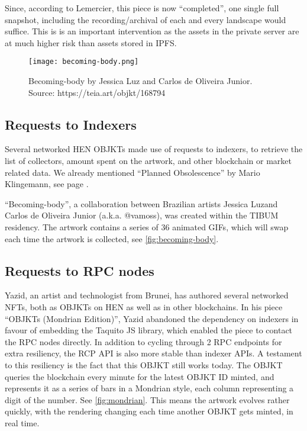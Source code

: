 Since, according to Lemercier, this piece is now ``completed'', one single full snapshot, including the recording/archival of each and every landscape would suffice. This is is an important intervention as the assets in the private server are at much higher risk than assets stored in IPFS.


\begin{figure}[h]
    \centering
    \captionsetup{justification=centering}
    \texttt{[image: becoming-body.png]}
    \captionsetup{justification=centering}
    \caption[Becoming-body by Jessica Luz and Carlos de Oliveira Junior]{Becoming-body by Jessica Luz and Carlos de Oliveira Junior. \\ Source: https://teia.art/objkt/168794}
    \label{fig:becoming-body}
\end{figure}

\subsection{Requests to Indexers}

Several networked HEN OBJKTs made use of requests to indexers, to retrieve the list of collectors, amount spent on the artwork, and other blockchain or market related data.
We already mentioned ``Planned Obsolescence'' by Mario Klingemann, see page \pageref{fig:plannedobsolescence}.

``Becoming-body'', a collaboration between Brazilian artists Jessica Luz\footnotemark[3] and Carlos de Oliveira Junior (a.k.a. @vamoss\footnotemark[4]), was created within the TIBUM residency. The artwork contains a series of 36 animated GIFs, which will swap each time the artwork is collected, see \autoref{fig:becoming-body}.



\subsection{Requests to RPC nodes}

Yazid\footnotemark[5], an artist and technologist from Brunei, has authored several networked NFTs, both as OBJKTs on HEN as well as in other blockchains. In his piece ``OBJKTs (Mondrian Edition)'', Yazid abandoned the dependency on indexers in favour of embedding the Taquito JS library, which enabled the piece to contact the RPC nodes directly. In addition to cycling through 2 RPC endpoints for extra resiliency, the RCP API is also more stable than indexer APIs. A testament to this resiliency is the fact that this OBJKT still works today. The OBJKT queries the blockchain every minute for the latest OBJKT ID minted, and represents it as a series of bars in a Mondrian style, each column representing a digit of the number. See \autoref{fig:mondrian}. This means the artwork evolves rather quickly, with the rendering changing each time another OBJKT gets minted, in real time.

